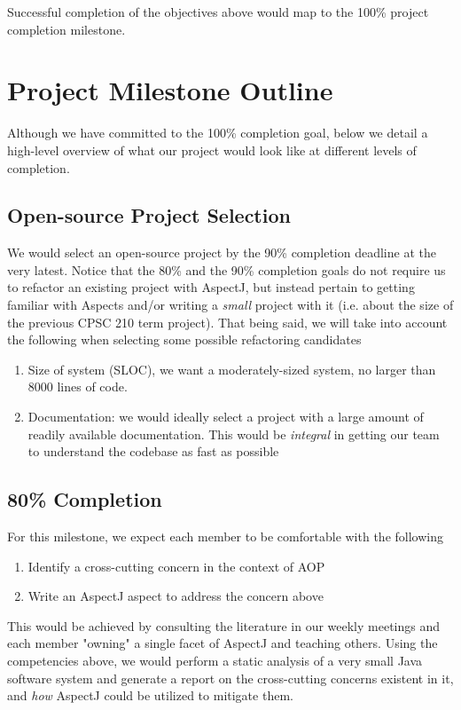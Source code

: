 \documentclass[sigconf]{acmart}
\begin{document}
Successful completion of the objectives above would map to the 100\% project completion milestone.

\section{Project Milestone Outline}
Although we have committed to the 100\% completion goal, below we detail a high-level overview of what our project would look like at different levels of completion. 

\subsection{Open-source Project Selection}
We would select an open-source project by the 90\% completion deadline at the very latest. Notice that the 80\% and the 90\% completion goals do not require us to refactor an existing project with AspectJ, but instead pertain to getting familiar with Aspects and/or writing a \textit{small} project with it (i.e. about the size of the previous CPSC 210 term project). That being said, we will take into account the following when selecting some possible refactoring candidates
\begin{enumerate}
    \item Size of system (SLOC), we want a moderately-sized system, no larger than 8000 lines of code.
    \item Documentation: we would ideally select a project with a large amount of readily available documentation. This would be \textit{integral} in getting our team to understand the codebase as fast as possible
\end{enumerate}

\subsection{80\% Completion}
For this milestone, we expect each member to be comfortable with the following
\begin{enumerate}
    \item Identify a cross-cutting concern in the context of AOP
    \item Write an AspectJ aspect to address the concern above
\end{enumerate}
This would be achieved by consulting the literature in our weekly meetings and each member "owning" a single facet of AspectJ and teaching others. Using the competencies above, we would perform a static analysis of a very small Java software system and generate a report on the cross-cutting concerns existent in it, and \textit{how} AspectJ could be utilized to mitigate them.
\end{document}
